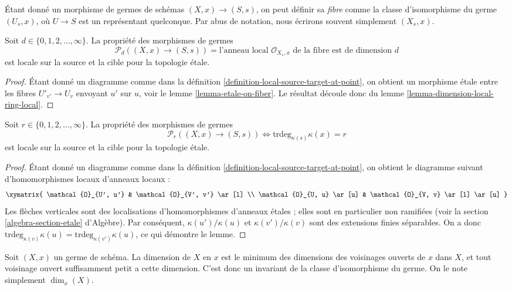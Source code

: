 \noindent
Étant donné un morphisme de germes de schémas $(X, x) \to (S, s)$,
on peut définir sa {\it fibre} comme la classe d'isomorphisme du germe
$(U_s, x)$, où $U \to S$ est un représentant quelconque. Par abus de
notation, nous écrirons souvent simplement $(X_s, x)$.

\begin{lemma}
\label{lemma-dimension-local-ring-fibre}
Soit $d \in \{0, 1, 2, \ldots, \infty\}$.
La propriété des morphismes de germes
$$
\mathcal{P}_d((X, x) \to (S, s)) =
\text{l'anneau local }
\mathcal{O}_{X_s, x}
\text{ de la fibre est de dimension }d
$$
est locale sur la source et la cible pour la topologie \'etale.
\end{lemma}

\begin{proof}
Étant donné un diagramme comme dans la
définition \ref{definition-local-source-target-at-point}, on obtient un
morphisme \'etale entre les fibres $U'_{v'} \to U_v$ envoyant $u'$ sur $u$,
voir le lemme \ref{lemma-etale-on-fiber}. Le résultat découle donc du
lemme \ref{lemma-dimension-local-ring-local}.
\end{proof}

\begin{lemma}
\label{lemma-transcendence-degree-at-point}
Soit $r \in \{0, 1, 2, \ldots, \infty\}$.
La propriété des morphismes de germes
$$
\mathcal{P}_r((X, x) \to (S, s))
\Leftrightarrow
\text{trdeg}_{\kappa(s)} \kappa(x) = r
$$
est locale sur la source et la cible pour la topologie \'etale.
\end{lemma}

\begin{proof}
Étant donné un diagramme comme dans la
définition \ref{definition-local-source-target-at-point}, on obtient le
diagramme suivant d'homomorphismes locaux d'anneaux locaux :
$$
\xymatrix{
\mathcal{O}_{U', u'} & \mathcal{O}_{V', v'} \ar[l] \\
\mathcal{O}_{U, u} \ar[u] & \mathcal{O}_{V, v} \ar[l] \ar[u]
}
$$
Les flèches verticales sont des localisations d'homomorphismes d'anneaux
étales ; elles sont en particulier non ramifiées (voir la
section \ref{algebra-section-etale} d'Algèbre).
Par conséquent, $\kappa(u')/\kappa(u)$ et $\kappa(v')/\kappa(v)$ sont des
extensions finies séparables. On a donc
$\text{trdeg}_{\kappa(v)} \kappa(u) = \text{trdeg}_{\kappa(v')} \kappa(u)$,
ce qui démontre le lemme.
\end{proof}

\noindent
Soit $(X, x)$ un germe de schéma. La dimension de $X$ en $x$ est le minimum
des dimensions des voisinages ouverts de $x$ dans $X$, et tout voisinage
ouvert suffisamment petit a cette dimension. C'est donc un invariant de la
classe d'isomorphisme du germe. On le note simplement $\dim_x(X)$.

